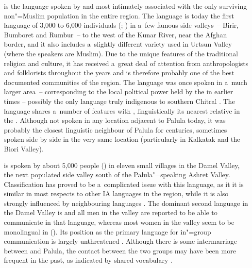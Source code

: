 \textbf{\iliKalasha [kls]} is the language spoken by and most intimately associated with the only surviving non"=Muslim population in the entire region. The language is today the first language of 3,000 to 6,000 individuals (\citealt[xi]{trailcooper1999}; \citealt[8]{heegardpetersen2006}) in a~few famous side valleys~-- Birir, Bumboret and Rumbur~-- to the west of the Kunar River, near the Afghan border, and it also includes a~slightly different variety used in Urtsun Valley (where the speakers are Muslim). Due to the unique features of the traditional \iliKalasha religion and culture, it has received a~great deal of attention from anthropologists and folklorists throughout the years and is therefore probably one of the best documented communities of the region. The \iliKalasha language was once spoken in a~much larger area~-- corresponding to the local political power held by the \iliKalasha in earlier times \citep[33]{siiger1956} -- possibly the only language truly indigenous to southern Chitral \citep{strand2001}. The language shares a~number of features with \iliKhowar, linguistically its nearest relative in the \iliChitralgroup. Although not spoken in any location adjacent to Palula today, it was probably the closest linguistic neighbour of Palula for centuries, sometimes spoken side by side in the very same location (particularly in Kalkatak and the Biori Valley).


\textbf{\iliDameli [dml]} is spoken by about 5,000 people (\citealt[118]{decker1992a}) in eleven small villages in the Damel Valley, the next populated side valley south of the Palula"=speaking Ashret Valley. Classification has proved to be a~complicated issue with this language, as it it is similar in most respects to other IA languages in the region, while it is also strongly influenced by neighbouring \iliNuristani languages \citep[254]{strand2001}. The dominant second language in the Damel Valley is \iliPashto and all men in the valley are reported to be able to communicate in that language, whereas most women in the valley seem to be monolingual in \iliDameli (\citealt{decker1992a}). Its position as the primary language for in"=group communication is largely unthreatened \citep[7]{perder2013}. Although there is some intermarriage between \iliDameli and Palula, the contact between the two groups may have been more frequent in the past, as indicated by shared vocabulary \citep[59--60]{morgenstierne1932}.


